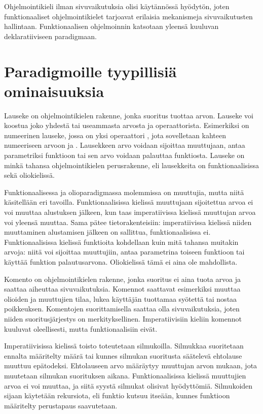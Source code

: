 Ohjelmointikieli ilman sivuvaikutuksia olisi käytännössä hyödytön, joten funktionaaliset ohjelmointikielet tarjoavat erilaisia mekanismeja sivuvaikutusten hallintaan.  Funktionaalisen ohjelmoinnin katsotaan yleensä kuuluvan deklaratiiviseen paradigmaan. \cite[Luku 11]{principlesAndParadigms}


\section{Paradigmoille tyypillisiä ominaisuuksia}
Lauseke on ohjelmointikielen rakenne, jonka suoritus tuottaa arvon. Lauseke voi koostua joko yhdestä tai useammasta arvosta ja operaattorista. Esimerkiksi  on numeerinen lauseke, jossa on yksi operaattori \code{+}, jota sovelletaan kahteen numeeriseen arvoon  ja . Lausekkeen arvo voidaan sijoittaa muuttujaan, antaa parametriksi funktioon tai sen arvo voidaan palauttaa funktiosta. Lauseke on minkä tahansa ohjelmointikielen perusrakenne, eli lausekkeita on funktionaalisissa sekä oliokielissä.
\cite[Luku 6]{principlesAndParadigms}

Funktionaalisessa ja olioparadigmassa molemmissa on muuttujia, mutta niitä käsitellään eri tavoilla. Funktionaalisissa kielissä muuttujaan sijoitettua arvoa ei voi muuttaa alustuksen jälkeen, kun taas imperatiivissa kielissä muuttujan arvoa voi yleensä muuttaa. Sama pätee tietorakenteisiin: imperatiivissa kielissä niiden muuttaminen alustamisen jälkeen on sallittua, funktionaalisissa ei. \cite[Luku 3]{functionalProgrammingInScala} Funktionaalisissa kielissä funktioita kohdellaan kuin mitä tahansa muitakin arvoja: niitä voi sijoittaa muuttujiin, antaa parametrina toiseen funktioon tai käyttää funktion palautusarvona. Oliokielissä tämä ei aina ole mahdollista.
\cite[Luku 6]{principlesAndParadigms}

Komento on ohjelmointikielen rakenne, jonka suoritus ei aina tuota arvoa ja saattaa aiheuttaa sivuvaikutuksia. Komennot saattavat esimerkiksi muuttaa olioiden ja muuttujien tilaa, lukea käyttäjän tuottamaa syötettä tai nostaa poikkeuksen. Komentojen suorittamisella saattaa olla sivuvaikutuksia, joten niiden suoritusjärjestys on merkityksellinen. Imperatiivisiin kieliin komennot kuuluvat oleellisesti, mutta funktionaalisiin eivät.

Imperatiivisissa kielissä toisto toteutetaan silmukoilla. Silmukkaa suoritetaan ennalta määritelty määrä tai kunnes silmukan suoritusta säätelevä ehtolause muuttuu epätodeksi. Ehtolauseen arvo määräytyy muuttujan arvon mukaan, jota muutetaan silmukan suorituksen aikana. Funktionaalisissa kielissä muuttujien arvoa ei voi muuttaa, ja siitä syystä silmukat olisivat hyödyttömiä. Silmukoiden sijaan käytetään rekursiota, eli funktio kutsuu itseään, kunnes funktioon määritelty perustapaus saavutetaan.
\cite[Luku 6 ja 11]{principlesAndParadigms}

